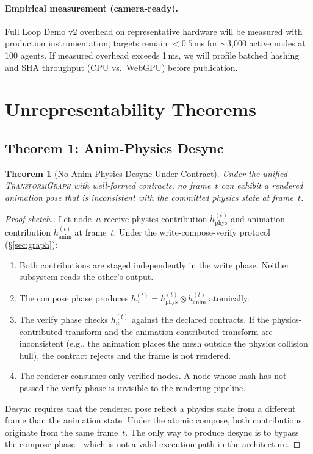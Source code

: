 \documentclass[sigconf,nonacm]{acmart}
\newcommand{\transformgraph}{\textsc{TransformGraph}}
\newcommand{\tropmult}{\otimes}
\newtheorem{theorem}{Theorem}
\begin{document}
\paragraph{Empirical measurement (camera-ready).}
Full Loop Demo v2 overhead on representative hardware will be
measured with production instrumentation; targets remain
$<0.5$\,ms for $\sim$3{,}000 active nodes at 100 agents.
If measured overhead exceeds 1\,ms, we will profile batched
hashing and SHA throughput (CPU vs.\ WebGPU) before publication.

\section{Unrepresentability Theorems}
\label{sec:unrep}

\subsection{Theorem 1: Anim-Physics Desync}
\begin{theorem}[No Anim-Physics Desync Under Contract]
Under the unified \transformgraph{} with well-formed contracts,
no frame~$t$ can exhibit a rendered animation pose that is
inconsistent with the committed physics state at frame~$t$.
\end{theorem}

\begin{proof}[Proof sketch.]
Let node~$n$ receive physics contribution $h_{\text{phys}}^{(t)}$
and animation contribution $h_{\text{anim}}^{(t)}$ at frame~$t$.
Under the write-compose-verify protocol (\S\ref{sec:graph}):
\begin{enumerate}
  \item Both contributions are staged independently in the write
    phase. Neither subsystem reads the other's output.
  \item The compose phase produces
    $h_n^{(t)} = h_{\text{phys}}^{(t)} \tropmult h_{\text{anim}}^{(t)}$
    atomically.
  \item The verify phase checks $h_n^{(t)}$ against the declared
    contracts. If the physics-contributed transform and the
    animation-contributed transform are inconsistent (e.g., the
    animation places the mesh outside the physics collision hull),
    the contract rejects and the frame is not rendered.
  \item The renderer consumes only verified nodes. A node whose
    hash has not passed the verify phase is invisible to the
    rendering pipeline.
\end{enumerate}
Desync requires that the rendered pose reflect a physics state
from a different frame than the animation state. Under the
atomic compose, both contributions originate from the same
frame~$t$. The only way to produce desync is to bypass the
compose phase---which is not a valid execution path in the
architecture.
\end{proof}
\end{document}
